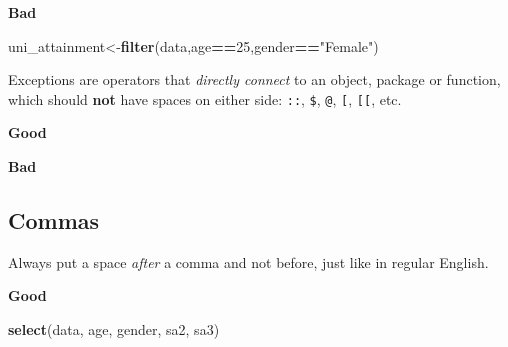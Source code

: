 \documentclass[]{book}
\newenvironment{Shaded}{\begin{snugshade}}{\end{snugshade}}
\newcommand{\DecValTok}[1]{\textcolor[rgb]{0.00,0.00,0.81}{#1}}
\newcommand{\KeywordTok}[1]{\textcolor[rgb]{0.13,0.29,0.53}{\textbf{#1}}}
\newcommand{\NormalTok}[1]{#1}
\newcommand{\OperatorTok}[1]{\textcolor[rgb]{0.81,0.36,0.00}{\textbf{#1}}}
\newcommand{\StringTok}[1]{\textcolor[rgb]{0.31,0.60,0.02}{#1}}
\begin{document}
\textbf{Bad}

\begin{Shaded}
\begin{Highlighting}[]
\NormalTok{uni_attainment<-}\KeywordTok{filter}\NormalTok{(data,age}\OperatorTok{==}\DecValTok{25}\NormalTok{,gender}\OperatorTok{==}\StringTok{"Female"}\NormalTok{)}
\end{Highlighting}
\end{Shaded}

Exceptions are operators that \emph{directly connect} to an object, package or function, which should \textbf{not} have spaces on either side: \texttt{::}, \texttt{\$}, \texttt{@}, \texttt{{[}}, \texttt{{[}{[}}, etc.

\textbf{Good}

\begin{Shaded}
\end{Shaded}

\textbf{Bad}

\begin{Shaded}
\end{Shaded}

\hypertarget{commas}{%
\subsection{Commas}\label{commas}}

Always put a space \emph{after} a comma and not before, just like in regular English.

\textbf{Good}

\begin{Shaded}
\begin{Highlighting}[]
\KeywordTok{select}\NormalTok{(data, age, gender, sa2, sa3)}
\end{Highlighting}
\end{Shaded}
\end{document}

